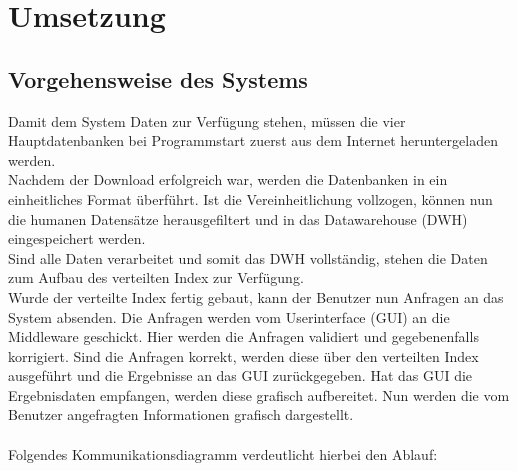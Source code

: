 \documentclass{scrartcl}
\begin{document}
\newpage
\section{Umsetzung}
\subsection{Vorgehensweise des Systems}
Damit dem System Daten zur Verfügung stehen, müssen die vier Hauptdatenbanken bei Programmstart zuerst aus dem Internet heruntergeladen werden.\\
Nachdem der Download erfolgreich war, werden die Datenbanken in ein einheitliches Format überführt. Ist die Vereinheitlichung vollzogen, können nun die humanen Datensätze herausgefiltert und in das Datawarehouse (DWH) eingespeichert werden.
\\
Sind alle Daten verarbeitet und somit das DWH vollständig, stehen die Daten zum Aufbau des verteilten Index zur Verfügung. \\
Wurde der verteilte Index fertig gebaut, kann der Benutzer nun Anfragen an das System absenden. Die Anfragen werden vom Userinterface (GUI) an die Middleware geschickt. Hier werden die Anfragen validiert und gegebenenfalls korrigiert. Sind die Anfragen korrekt, werden diese über den verteilten Index ausgeführt und die Ergebnisse an das GUI zurückgegeben. Hat das GUI die Ergebnisdaten empfangen, werden diese grafisch aufbereitet. Nun werden die vom Benutzer angefragten Informationen grafisch dargestellt.\\\\
Folgendes Kommunikationsdiagramm verdeutlicht hierbei den Ablauf:\\\\
\begin{center}
\end{center}
\end{document}
